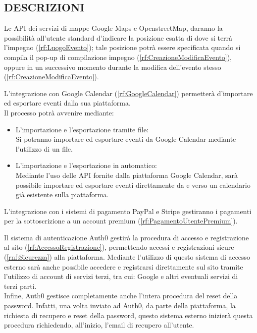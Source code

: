 \subsection*{DESCRIZIONI}
\begin{listaPersonale}[BE]{}
 Le API dei servizi di mappe Google Maps e OpenstreetMap, daranno la possibilità all'utente standard d'indicare la posizione esatta di dove si terrà l'impegno (\ref{rf:LuogoEvento}); tale posizione potrà essere specificata quando si compila il pop-up di compilazione impegno (\ref{rf:CreazioneModificaEvento}), oppure in un successivo momento durante la modifica dell'evento stesso (\ref{rf:CreazioneModificaEvento}).

 L'integrazione con Google Calendar (\ref{rf:GoogleCalendar}) permetterà d'importare ed esportare eventi dalla sua piattaforma.\\
Il processo potrà avvenire mediante:
\begin{itemize}
    \item L'importazione e l'esportazione tramite file: \\
          Si potranno importare ed esportare eventi da Google Calendar mediante l'utilizzo di un file.
    \item L'importazione e l'esportazione in automatico: \\
          Mediante l'uso delle API fornite dalla piattaforma Google Calendar, sarà possibile importare ed esportare eventi direttamente da e verso un calendario già esistente sulla piattaforma.
\end{itemize}

 L'integrazione con i sistemi di pagamento PayPal e Stripe gestiranno i pagamenti per la sottoscrizione a un account premium (\ref{rf:PagamentoUtentePremium}).

 Il sistema di autenticazione Auth0 gestirà la procedura di accesso e registrazione al sito (\ref{rf:AccessoRegistrazione}), permettendo accessi e registrazioni sicure (\ref{rnf:Sicurezza}) alla piattaforma. Mediante l'utilizzo di questo sistema di accesso esterno sarà anche possibile accedere e registrarsi direttamente sul sito tramite l'utilizzo di account di servizi terzi, tra cui: Google e altri eventuali servizi di terzi parti. \\ Infine, Auth0 gestisce completamente anche l'intera procedura del reset della password. Infatti, una volta inviato ad Auth0, da parte della piattaforma, la richiesta di recupero e reset della password, questo sistema esterno inizierà questa procedura richiedendo, all'inizio, l'email di recupero all'utente.


\end{listaPersonale}
